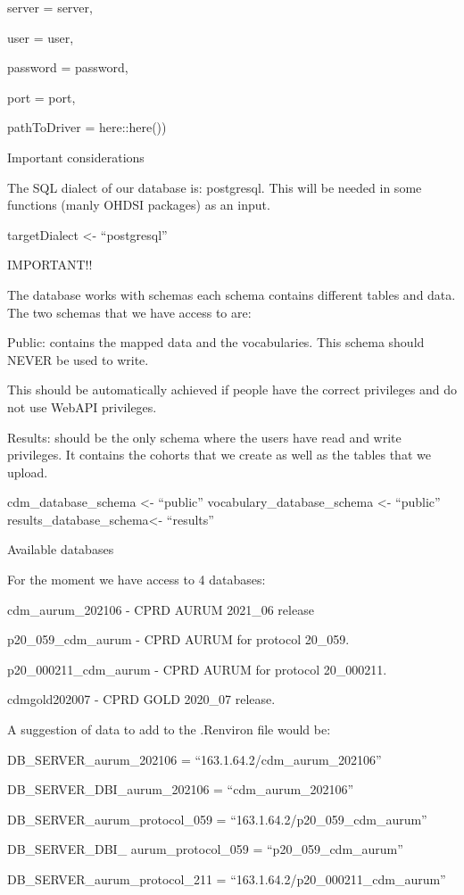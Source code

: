 \documentclass[
  letterpaper,
  DIV=11,
  numbers=noendperiod]{scrreprt}
\begin{document}
server = server,

user = user,

password = password,

port = port,

pathToDriver = here::here())

Important considerations

The SQL dialect of our database is: postgresql. This will be needed in
some functions (manly OHDSI packages) as an input.

targetDialect \textless- ``postgresql''

IMPORTANT!!

The database works with schemas each schema contains different tables
and data. The two schemas that we have access to are:

Public: contains the mapped data and the vocabularies. This schema
should NEVER be used to write.

This should be automatically achieved if people have the correct
privileges and do not use WebAPI privileges.

Results: should be the only schema where the users have read and write
privileges. It contains the cohorts that we create as well as the tables
that we upload.

cdm\_database\_schema \textless- ``public'' vocabulary\_database\_schema
\textless- ``public'' results\_database\_schema\textless- ``results''

Available databases

For the moment we have access to 4 databases:

cdm\_aurum\_202106 - CPRD AURUM 2021\_06 release

p20\_059\_cdm\_aurum - CPRD AURUM for protocol 20\_059.

p20\_000211\_cdm\_aurum - CPRD AURUM for protocol 20\_000211.

cdmgold202007 - CPRD GOLD 2020\_07 release.

A suggestion of data to add to the .Renviron file would be:

DB\_SERVER\_aurum\_202106 = ``163.1.64.2/cdm\_aurum\_202106''

DB\_SERVER\_DBI\_aurum\_202106 = ``cdm\_aurum\_202106''

DB\_SERVER\_aurum\_protocol\_059 = ``163.1.64.2/p20\_059\_cdm\_aurum''

DB\_SERVER\_DBI\_ aurum\_protocol\_059 = ``p20\_059\_cdm\_aurum''

DB\_SERVER\_aurum\_protocol\_211 =
``163.1.64.2/p20\_000211\_cdm\_aurum''
\end{document}
